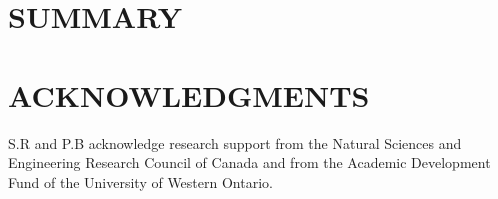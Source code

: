 \documentclass[useAMS,usenatbib]{mn2e}
\begin{document}
\section{SUMMARY}





\section*{ACKNOWLEDGMENTS}
S.R and P.B acknowledge research support from the Natural Sciences and Engineering Research Council of Canada and from the Academic Development Fund of the University of Western Ontario.


\end{document}
